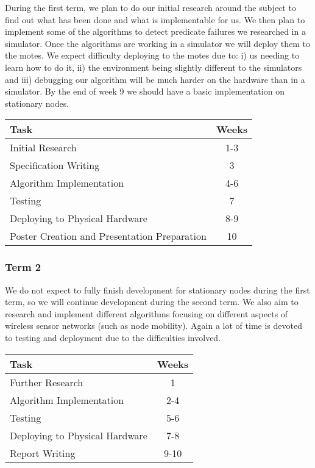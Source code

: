 \documentclass[a4paper]{article}
\begin{document}
During the first term, we plan to do our initial research around the subject to find out what has been done and what is implementable for us. We then plan to implement some of the algorithms to detect predicate failures we researched in a simulator. Once the algorithms are working in a simulator we will deploy them to the motes. We expect difficulty deploying to the motes due to: i) us needing to learn how to do it, ii) the environment being slightly different to the simulators and iii) debugging our algorithm will be much harder on the hardware than in a simulator. By the end of week 9 we should have a basic implementation on stationary nodes.

\begin{table}[H]
	\centering
	\begin{tabular}{| l | c |}
	\hline
	\textbf{Task} & \textbf{Weeks}\\
	\hline
	Initial Research & 1-3\\
	\hline
	Specification Writing & 3\\
	\hline
	Algorithm Implementation & 4-6\\
	\hline
	Testing & 7\\
	\hline
	Deploying to Physical Hardware & 8-9\\
	\hline
	Poster Creation and Presentation Preparation & 10\\
	\hline
	\end{tabular}
\end{table}

\subsubsection{Term 2}

We do not expect to fully finish development for stationary nodes during the first term, so we will continue development during the second term. We also aim to research and implement different algorithms focusing on different aspects of wireless sensor networks (such as node mobility). Again a lot of time is devoted to testing and deployment due to the difficulties involved.

\begin{table}[H]
	\centering
	\begin{tabular}{| l | c |}
	\hline
	\textbf{Task} & \textbf{Weeks}\\
	\hline
	Further Research & 1\\
	\hline
	Algorithm Implementation & 2-4\\
	\hline
	Testing & 5-6\\
	\hline
	Deploying to Physical Hardware & 7-8\\
	\hline
	Report Writing & 9-10\\
	\hline
	\end{tabular}
\end{table}
\end{document}

